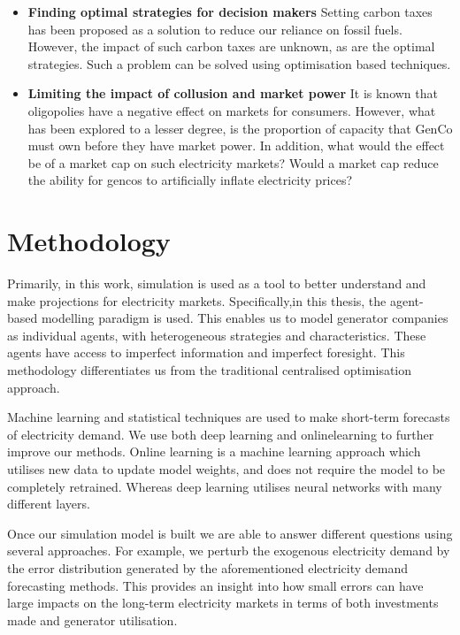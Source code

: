 \begin{itemize}
	\item \textbf{Finding optimal strategies for decision makers} Setting carbon taxes has been proposed as a solution to reduce our reliance on fossil fuels. However, the impact of such carbon taxes are unknown, as are the optimal strategies. Such a problem can be solved using optimisation based techniques.

	\item \textbf{Limiting the impact of collusion and market power} It is known that oligopolies have a negative effect on markets for consumers. However, what has been explored to a lesser degree, is the proportion of capacity that \gls{GenCo} must own before they have market power. In addition, what would the effect be of a market cap on such electricity markets? Would a market cap reduce the ability for \acrfull{gencos} to artificially inflate electricity prices?

\end{itemize}

\section{Methodology}

Primarily, in this work, simulation is used as a tool to better understand and make projections for electricity markets. Specifically,in this thesis, the agent-based modelling paradigm is used. This enables us to model generator companies as individual agents, with heterogeneous strategies and characteristics. These agents have access to imperfect information and imperfect foresight. This methodology differentiates us from the traditional centralised optimisation approach.

Machine learning and statistical techniques are used to make short-term forecasts of electricity demand. We use both deep learning and \gls{onlinelearning} to further improve our methods. Online learning is a machine learning approach which utilises new data to update model weights, and does not require the model to be completely retrained. Whereas deep learning utilises neural networks with many different layers.

Once our simulation model is built we are able to answer different questions using several approaches. For example, we perturb the exogenous electricity demand by the error distribution generated by the aforementioned electricity demand forecasting methods. This provides an insight into how small errors can have large impacts on the long-term electricity markets in terms of both investments made and generator utilisation.

